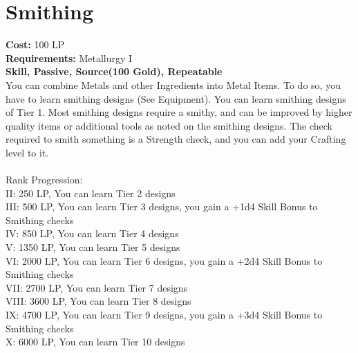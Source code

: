 \section{Smithing}\label{perk:smithing}
\textbf{Cost:} 100 LP\\
\textbf{Requirements:} Metallurgy I\\
\textbf{Skill, Passive, Source(100 Gold), Repeatable}\\
You can combine Metals and other Ingredients into Metal Items.
To do so, you have to learn smithing designs (See Equipment).
You can learn smithing designs of Tier 1.
Most smithing designs require a smithy, and can be improved by higher quality items or additional tools as noted on the smithing designs.
The check required to smith something is a Strength check, and you can add your Crafting level to it.\\
\\
Rank Progression:\\
II: 250 LP, You can learn Tier 2 designs\\
III: 500 LP, You can learn Tier 3 designs, you gain a +1d4 Skill Bonus to Smithing checks\\
IV: 850 LP, You can learn Tier 4 designs\\
V: 1350 LP, You can learn Tier 5 designs\\
VI: 2000 LP, You can learn Tier 6 designs, you gain a +2d4 Skill Bonus to Smithing checks\\
VII: 2700 LP, You can learn Tier 7 designs\\
VIII: 3600 LP, You can learn Tier 8 designs\\
IX: 4700 LP, You can learn Tier 9 designs, you gain a +3d4 Skill Bonus to Smithing checks\\
X: 6000 LP, You can learn Tier 10 designs\\